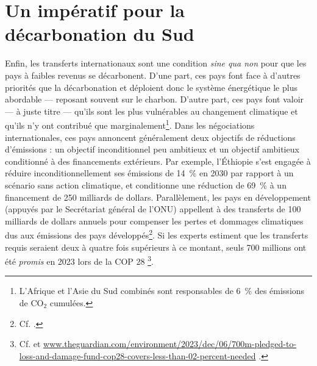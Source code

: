 \documentclass[a5paper,french,openany]{memoir}
\begin{document}

\section{Un impératif pour la décarbonation du Sud}
Enfin, les transferts internationaux sont une condition \textit{sine qua non} pour que les pays à faibles revenus se décarbonent. D'une part, ces pays font face à d'autres priorités que la décarbonation et déploient donc le système énergétique le plus abordable --- reposant souvent sur le charbon. D'autre part, ces pays font valoir --- à juste titre --- qu'ils sont les plus vulnérables au changement climatique et qu'ils n'y ont contribué que marginalement\footnote{L'Afrique et l'Asie du Sud combinés sont responsables de 6~\% des émissions de CO$_\text{2}$ cumulées. %
}. Dans les négociations internationales, ces pays annoncent généralement deux objectifs de réductions d'émissions : un objectif inconditionnel peu ambitieux et un objectif ambitieux conditionné à des financements extérieurs. Par exemple, l'Éthiopie s'est engagée à réduire inconditionnellement ses émissions de 14~\% en 2030 par rapport à un scénario sans action climatique, et conditionne une réduction de 69~\% à un financement de 250 milliards de dollars. %
Parallèlement, les pays en développement (appuyés par le Secrétariat général de l'ONU) appellent à des transferts de 100 milliards de dollars annuels pour compenser les pertes et dommages climatiques dus aux émissions des pays développés\footnote{Cf. \cite{tc_proposal_2023,sgnu_bridgetown_2023}.}. Si les experts estiment que les transferts requis seraient deux à quatre fois supérieurs à ce montant, seuls 700 millions ont été \textit{promis} en 2023 lors de la COP 28%
\footnote{Cf. \cite{songwe_climate_2023,markandya_integrated_2019,robinson_valuing_2021} et \href{https://www.theguardian.com/environment/2023/dec/06/700m-pledged-to-loss-and-damage-fund-cop28-covers-less-than-02-percent-needed}{www.theguardian.com/environment/2023/dec/06/700m-pledged-to-loss-and-damage-fund-cop28-covers-less-than-02-percent-needed}%
.}.
\end{document}
